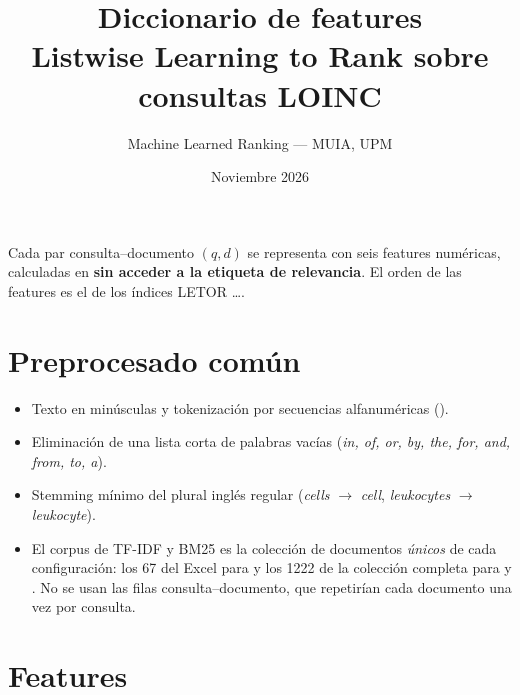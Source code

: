 \documentclass[11pt,a4paper]{article}
\title{Diccionario de features\\[2pt]\large Listwise Learning to Rank sobre consultas LOINC}
\author{Machine Learned Ranking --- MUIA, UPM}
\date{Noviembre 2026}
\begin{document}
\maketitle

Cada par consulta--documento $(q,d)$ se representa con seis features numéricas, calculadas en
 \textbf{sin acceder a la etiqueta de relevancia}. El orden de las features es el
de los índices LETOR \ldots{}.

\section*{Preprocesado común}

\begin{itemize}
\item Texto en minúsculas y tokenización por secuencias alfanuméricas (\code{[a-z0-9]+}).
\item Eliminación de una lista corta de palabras vacías (\emph{in, of, or, by, the, for, and, from, to, a}).
\item Stemming mínimo del plural inglés regular (\emph{cells} $\rightarrow$ \emph{cell}, \emph{leukocytes} $\rightarrow$ \emph{leukocyte}).
\item El corpus de TF-IDF y BM25 es la colección de documentos \emph{únicos} de cada configuración: los 67  del Excel para  y los 1222 de la colección completa para  y . No se usan las filas consulta--documento, que repetirían cada documento una vez por consulta.
\end{itemize}

\section*{Features}
\end{document}
